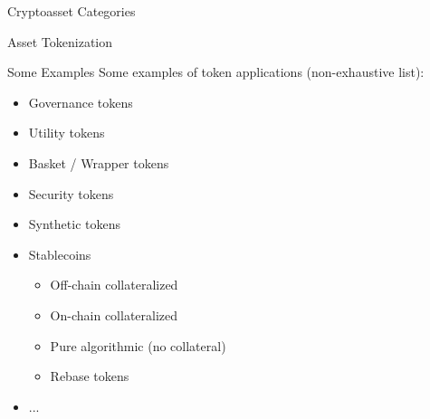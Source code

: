 \documentclass[handout]{beamer}
\begin{document}
\begin{frame}{Cryptoasset Categories}
\end{frame}

\begin{frame}{Asset Tokenization}
	\begin{figure} [h]
 		\center
			
 	\end{figure}
\end{frame}

\begin{frame}{Some Examples}
Some examples of token applications (non-exhaustive list):
	\begin{itemize}
		\item<2-> Governance tokens
		\item<3-> Utility tokens
		\item<4-> Basket / Wrapper tokens
		\item<5-> Security tokens
		\item<6-> Synthetic tokens
		\item<7-> Stablecoins
		\begin{itemize}
			\item<8-> Off-chain collateralized
			\item<9-> On-chain collateralized
			\item<10-> Pure algorithmic (no collateral)
			\item<11-> Rebase tokens
		\end{itemize}
		\item<12-> ...
 	\end{itemize}
 	
\end{frame}
\end{document}
